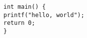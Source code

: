 \documentclass[12pt,ngerman]{scrartcl}
\begin{document}
\begin{verbatim}
int main() {
printf("hello, world");
return 0;
}
\end{verbatim}
\end{document}
